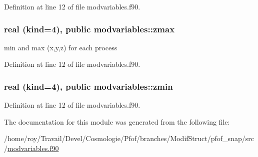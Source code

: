 Definition at line 12 of file modvariables.\-f90.

\hypertarget{classmodvariables_a5eed021bf6f608663c0259105d78dab1}{
\subsubsection[{zmax}]{\setlength{\rightskip}{0pt plus 5cm}real (kind=4), public modvariables\-::zmax}}\label{classmodvariables_a5eed021bf6f608663c0259105d78dab1}


min and max (x,y,z) for each process 



Definition at line 12 of file modvariables.\-f90.

\hypertarget{classmodvariables_aa7cab7253a8166f7c81ee25238e89b9a}{
\subsubsection[{zmin}]{\setlength{\rightskip}{0pt plus 5cm}real (kind=4), public modvariables\-::zmin}}\label{classmodvariables_aa7cab7253a8166f7c81ee25238e89b9a}


Definition at line 12 of file modvariables.\-f90.



The documentation for this module was generated from the following file\-:\begin{DoxyCompactItemize}
\item 
/home/roy/\-Travail/\-Devel/\-Cosmologie/\-Pfof/branches/\-Modif\-Struct/pfof\-\_\-snap/src/\hyperlink{pfof__snap_2src_2modvariables_8f90}{modvariables.\-f90}\end{DoxyCompactItemize}

